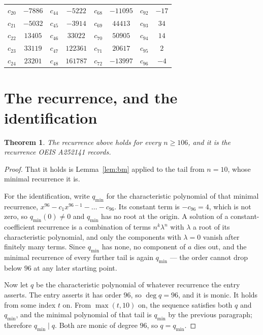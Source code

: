 \documentclass[11pt,a4paper]{article}
\theoremstyle{plain}
\newtheorem{theorem}{Theorem}
\theoremstyle{definition}
\begin{document}
\begin{center}
\begin{tabular}{cccccccc}
$c_{20}$ & $-7886$ & $c_{44}$ & $-5222$ & $c_{68}$ & $-11095$ & $c_{92}$ & $-17$ \\
$c_{21}$ & $-5032$ & $c_{45}$ & $-3914$ & $c_{69}$ & $44413$ & $c_{93}$ & $34$ \\
$c_{22}$ & $13405$ & $c_{46}$ & $33022$ & $c_{70}$ & $50905$ & $c_{94}$ & $14$ \\
$c_{23}$ & $33119$ & $c_{47}$ & $122361$ & $c_{71}$ & $20617$ & $c_{95}$ & $2$ \\
$c_{24}$ & $23201$ & $c_{48}$ & $161787$ & $c_{72}$ & $-13997$ & $c_{96}$ & $-4$ \\
\end{tabular}
\end{center}

\section{The recurrence, and the identification}

\begin{theorem}
The recurrence above holds for every $n\ge106$, and it is the recurrence OEIS A252141 records.
\end{theorem}

\begin{proof}
That it holds is Lemma~\ref{lem:bm} applied to the tail from $n=10$, whose minimal
recurrence it is.

For the identification, write $q_{\min}$ for the characteristic polynomial of that minimal
recurrence, $x^{96}-c_1x^{96-1}-\dots-c_{96}$. Its constant term is
$-c_{96}=4$, which is not zero, so $q_{\min}(0)\neq0$ and $q_{\min}$ has no
root at the origin. A solution of a constant-coefficient recurrence is a combination of terms
$n^{k}\lambda^{n}$ with $\lambda$ a root of its characteristic polynomial, and only the
components with $\lambda=0$ vanish after finitely many terms. Since $q_{\min}$ has none, no
component of $a$ dies out, and the minimal recurrence of every further tail is again
$q_{\min}$ --- the order cannot drop below $96$ at any later starting point.

Now let $q$ be the characteristic polynomial of whatever recurrence the entry asserts. The
entry asserts it has order $96$, so $\deg q=96$, and it is monic. It holds from some
index $t$ on. From $\max(t,10)$ on, the sequence satisfies both $q$ and $q_{\min}$, and
the minimal polynomial of that tail is $q_{\min}$ by the previous paragraph; therefore
$q_{\min}\mid q$. Both are monic of degree $96$, so $q=q_{\min}$.
\end{proof}
\end{document}
